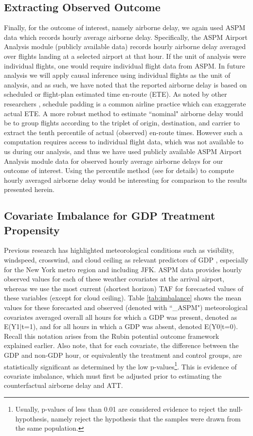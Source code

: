\documentclass[conference]{IEEEtran}
\begin{document}
\subsection{Extracting Observed Outcome}
Finally, for the outcome of interest, namely airborne delay, we again used ASPM data which records hourly average airborne delay.  Specifically, the ASPM Airport Analysis module (publicly available data) records hourly airborne delay averaged over flights landing at a selected airport at that hour.  If the unit of analysis were individual flights, one would require individual flight data from ASPM.  In future analysis we will apply causal inference using individual flights as the unit of analysis, and as such, we have noted that the reported airborne delay is based on scheduled or flight-plan estimated time en-route (ETE).  As noted by other researchers \cite{hao2013airlines,skaltsas2011analysis}, schedule padding is a common airline practice which can exaggerate actual ETE.  A more robust method to estimate ``nominal" airborne delay would be to group flights according to the triplet of origin, destination, and carrier to extract the tenth percentile of actual (observed) en-route times.  However such a computation requires access to individual flight data, which was not available to us during our analysis, and thus we have used publicly available ASPM Airport Analysis module data for observed hourly average airborne delays for our outcome of interest.  Using the percentile method (see \cite{skaltsas2011analysis} for details) to compute hourly averaged airborne delay would be interesting for comparison to the results presented herein.




\subsection{Covariate Imbalance for GDP Treatment Propensity}
Previous research has highlighted meteorological conditions such as visibility, windspeed, crosswind, and cloud ceiling as relevant predictors of GDP \cite{Grabbe:2014aa}, especially for the New York metro region and including JFK.  ASPM data provides hourly observed values for each of these weather covariates at the arrival airport, whereas we use the most current (shortest horizon) TAF for forecasted values of these variables (except for cloud ceiling).  Table \ref{tab:imbalance} shows the mean values for these forecasted and observed (denoted with ``\_ASPM") meteorological covariates averaged overall all hours for which a GDP was present, denoted as E(Y1$|$t=1), and for all hours in which a GDP was absent, denoted E(Y0$|$t=0).  Recall this notation arises from the Rubin potential outcome framework explained earlier.  Also note, that for each covariate, the difference between the GDP and non-GDP hour, or equivalently the treatment and control groups, are statistically significant as determined by the low p-values\footnote{Usually, p-values of less than 0.01 are considered evidence to reject the null-hypothesis, namely reject the hypothesis that the samples were drawn from the same population.}.  This is evidence of covariate imbalance, which must first be adjusted prior to estimating the counterfactual airborne delay and ATT.
\end{document}
